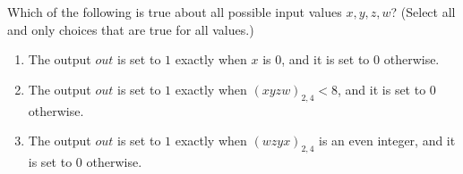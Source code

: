\documentclass[12pt, oneside]{article}
\begin{document}
\begin{enumerate}
{ Which of the following is true about all possible 
 input values $x,y,z,w$? (Select all and only 
 choices that are true for all values.)
 \begin{enumerate}
    \item The output $out$ is set to $1$ exactly when $x$ is $0$,
    and it is set to $0$ otherwise.
    \item The output $out$ is set to $1$ exactly when  $(xyzw)_{2,4} < 8$,
    and it is set to $0$ otherwise.
    \item The output $out$ is set to $1$ exactly when  $(wzyx)_{2,4}$
    is an even integer,
    and it is set to $0$ otherwise.
 \end{enumerate} }
\end{enumerate}
\end{document}
